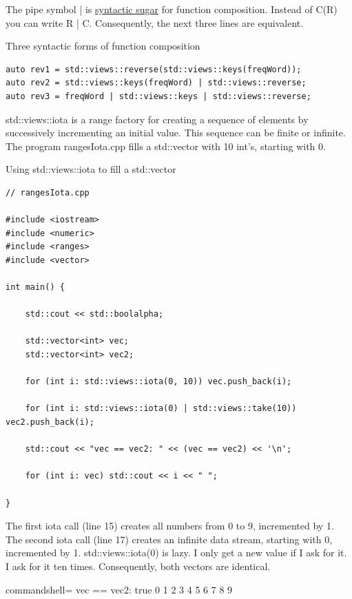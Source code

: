 The pipe symbol | is \href{https://en.wikipedia.org/wiki/Syntactic_sugar}{syntactic sugar} for function composition. Instead of C(R) you can write R | C. Consequently, the next three lines are equivalent.

\noindent
Three syntactic forms of function composition
\begin{lstlisting}[style=styleCXX]
auto rev1 = std::views::reverse(std::views::keys(freqWord));
auto rev2 = std::views::keys(freqWord) | std::views::reverse;
auto rev3 = freqWord | std::views::keys | std::views::reverse;
\end{lstlisting}


std::views::iota is a range factory for creating a sequence of elements by successively incrementing an initial value. This sequence can be finite or infinite. The program rangesIota.cpp fills a std::vector with 10 int’s, starting with 0.

\noindent
Using std::views::iota to fill a std::vector
\begin{lstlisting}[style=styleCXX]
// rangesIota.cpp

#include <iostream>
#include <numeric>
#include <ranges>
#include <vector>

int main() {
	
	std::cout << std::boolalpha;
	
	std::vector<int> vec;
	std::vector<int> vec2;
	
	for (int i: std::views::iota(0, 10)) vec.push_back(i);
	
	for (int i: std::views::iota(0) | std::views::take(10)) vec2.push_back(i);
	
	std::cout << "vec == vec2: " << (vec == vec2) << '\n';
	
	for (int i: vec) std::cout << i << " ";

}
\end{lstlisting}

The first iota call (line 15) creates all numbers from 0 to 9, incremented by 1. The second iota call (line 17) creates an infinite data stream, starting with 0, incremented by 1. std::views::iota(0) is lazy. I only get a new value if I ask for it. I ask for it ten times. Consequently, both vectors are identical.

\begin{tcblisting}{commandshell={}}
vec == vec2: true
0 1 2 3 4 5 6 7 8 9
\end{tcblisting}

